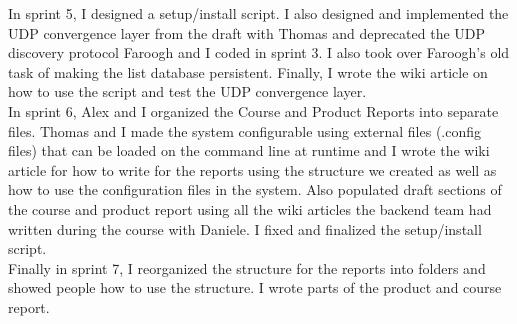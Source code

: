 In sprint 5,
I designed a setup/install script.
I also designed and implemented the UDP convergence layer from the draft with Thomas and deprecated the UDP discovery protocol Faroogh and I coded in sprint 3. 
I also took over Faroogh's old task of making the list database persistent. 
Finally, I wrote the wiki article on how to use the script and test the UDP convergence layer. \\

In sprint 6,
Alex and I organized the Course and Product Reports into separate files.
Thomas and I made the system configurable using external files (.config files) that can be loaded on the command line at runtime and
I wrote the wiki article for how to write for the reports using the structure we created as well as how to use the configuration files in the system.
Also populated draft sections of the course and product report using all the wiki articles the backend team had written during the course with Daniele.
I fixed and finalized the setup/install script.\\

Finally in sprint 7,
I reorganized the structure for the reports into folders and showed people how to use the structure.
I wrote parts of the product and course report.\\
